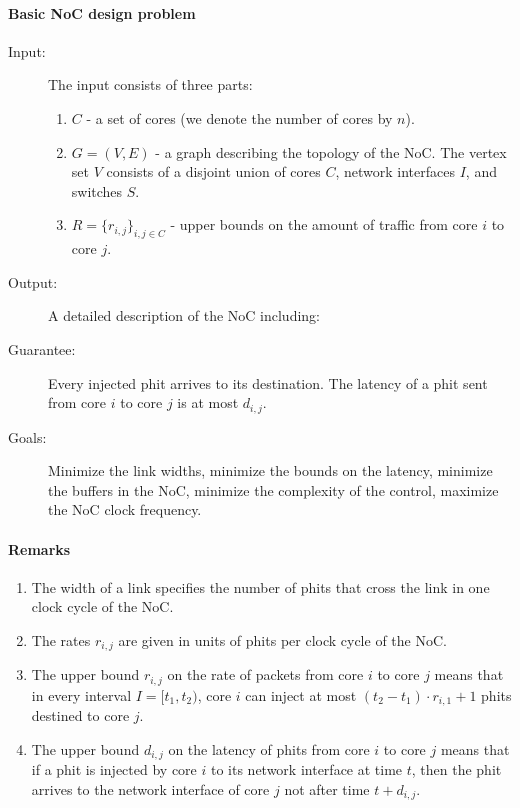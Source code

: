 \documentclass[a4paper,12pt]{article}
\newenvironment{proof sketch}[1]{\noindent {\emph{Proof sketch of #1:}}}{\hfill \qed}
\begin{document}
\paragraph{Basic NoC design problem}
\begin{description}
\item [Input:]
The input consists of three parts:
\begin{enumerate}
\item $C$ - a set of cores (we denote the number of cores by $n$).
\item $G=(V,E)$ - a graph describing the topology of the NoC. The vertex set $V$
  consists of a disjoint union of cores $C$, network interfaces $I$, and switches
  $S$.
\item $R=\{r_{i,j}\}_{i,j\in C}$ - upper bounds on the amount of traffic from core
  $i$ to core $j$. 
\end{enumerate}
\item[Output:] A detailed description of the NoC including:

\item[Guarantee:] Every injected phit arrives to its destination. The latency of a
  phit sent from core $i$ to core $j$ is at most $d_{i,j}$. 
\item[Goals:] Minimize the link widths, minimize the bounds on the latency, minimize
  the buffers in the NoC, minimize the complexity of the control, maximize the NoC
  clock frequency.
\end{description}

\paragraph{Remarks}
\begin{enumerate}
\item The width of a link specifies the number of phits that cross the link in one
  clock cycle of the NoC.
\item The rates $r_{i,j}$ are given in units of phits per clock cycle of the NoC.
\item The upper bound $r_{i,j}$ on the rate of packets from core $i$ to core $j$ means that
  in every interval $I=[t_1,t_2)$, core $i$ can inject at most $(t_2-t_1)\cdot
  r_{i,1} +1$ phits destined to core $j$.
\item The upper bound $d_{i,j}$ on the latency of phits from core $i$ to core $j$
  means that if a phit is injected by core $i$ to its network interface at time $t$,
  then the phit arrives to the network interface of core $j$ not after time
  $t+d_{i,j}$.
\end{enumerate}
\end{document}
